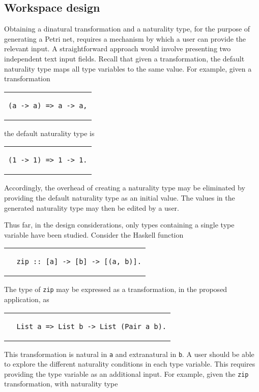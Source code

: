 \documentclass[../Dissertation.tex]{subfiles}
\begin{document}
\subsection{Workspace design}\label{sec:workspacedesign}
Obtaining a dinatural transformation and a naturality type, for the purpose of generating a Petri net, requires a mechanism by which a user can provide the relevant input. A straightforward approach would involve presenting two independent text input fields. Recall that given a transformation, the default naturality type maps all type variables to the same value. For example, given a transformation 
\begin{center}
\begin{tabular}{c}
\begin{lstlisting}
(a -> a) => a -> a,
\end{lstlisting}
\end{tabular}
\end{center}
the default naturality type is
\begin{center}
\begin{tabular}{c}
\begin{lstlisting}
(1 -> 1) => 1 -> 1.
\end{lstlisting}
\end{tabular}
\end{center}
Accordingly, the overhead of creating a naturality type may be eliminated by providing the default naturality type as an initial value. The values in the generated naturality type may then be edited by a user.
\par
Thus far, in the design considerations, only types containing a single type variable have been studied. Consider the Haskell function
\begin{center}
\begin{tabular}{c}
\begin{lstlisting}
  zip :: [a] -> [b] -> [(a, b)].
\end{lstlisting}
\end{tabular}
\end{center}
The type of \lstinline{zip} may be expressed as a transformation, in the proposed application, as
\begin{center}
\begin{tabular}{c}
\begin{lstlisting}
  List a => List b -> List (Pair a b).
\end{lstlisting}
\end{tabular}
\end{center}
This transformation is natural in \lstinline{a} and extranatural in \lstinline{b}. A user should be able to explore the different naturality conditions in each type variable. This requires providing the type variable as an additional input. For example, given the \lstinline{zip} transformation, with naturality type
\end{document}
